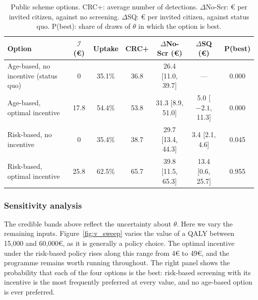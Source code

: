 \documentclass[12pt]{article}
\begin{document}
\begin{table}[h!]
\centering
\footnotesize
\caption{Public scheme options. CRC+: average number of detections. $\Delta$No-Scr: € per invited citizen, against no screening. $\Delta$SQ: € per invited citizen, against status quo. P(best): share of draws of $\theta$ in which the option is best.}
\label{tab:public_results}
\begin{tabular}{l c c c c c c}
\toprule
\textbf{Option} & $\mathcal{I}$ (€) & \textbf{Uptake} & \textbf{CRC+}
  & \textbf{$\Delta$No-Scr (€)} & \textbf{$\Delta$SQ (€)} & \textbf{P(best)} \\
\midrule
Age-based, no incentive (status quo) & 0    & 35.1\% & 36.8 & 26.4 [11.0, 39.7] & ---                 & 0.000 \\
Age-based, optimal incentive         & 17.8 & 54.4\% & 53.8 & 31.3 [8.9, 51.0]  & 5.0 [$-2.1$, 11.3]  & 0.000 \\
Risk-based, no incentive             & 0    & 35.4\% & 38.7 & 29.7 [13.4, 44.3] & 3.4 [2.1, 4.6]      & 0.045 \\
Risk-based, optimal incentive        & 25.8 & 62.5\% & 65.7 & 39.8 [11.5, 65.3] & 13.4 [0.6, 25.7]    & 0.955 \\
\bottomrule
\end{tabular}
\end{table}


\subsubsection{Sensitivity analysis} \label{sec:public_sens_analysis}

The credible bands above reflect the uncertainty about $\theta$. Here we vary the remaining inputs. Figure~\ref{fig:v_sweep} varies the value of a QALY between 15{,}000 and 60{,}000€, as it is generally a policy choice. The optimal incentive under the risk-based policy rises along this range from 4€ to 49€, and the programme remains worth running throughout. The right panel shows the probability that each of the four options is the best: risk-based screening with its incentive is the most frequently preferred at every value, and no age-based option is ever preferred.
\end{document}
